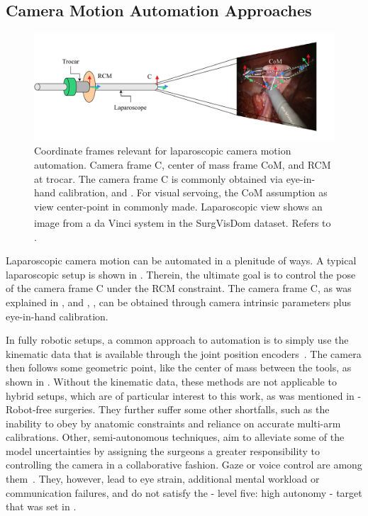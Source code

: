 \subsection{Camera Motion Automation Approaches}
\label{in:sec:automation_approaches}
\begin{figure}[htb]
    \centering
    \includegraphics[width=\textwidth]{introduction/fig/rule_based_approaches.pdf}
    \caption{Coordinate frames relevant for laparoscopic camera motion automation. Camera frame C, center of mass frame CoM, and RCM at trocar. The camera frame C is commonly obtained via eye-in-hand calibration,  and . For visual servoing, the CoM assumption as view center-point in commonly made. Laparoscopic view shows an image from a da Vinci\textsuperscript{\textregistered} system in the SurgVisDom\cite{zia2021surgical} dataset. Refers to .}
    \label{in:fig:com}
\end{figure}
Laparoscopic camera motion can be automated in a plenitude of ways. A typical laparoscopic setup is shown in . Therein, the ultimate goal is to control the pose of the camera frame C under the RCM constraint. The camera frame C, as was explained in 
, and , , can be obtained through camera intrinsic parameters plus eye-in-hand calibration.

In fully robotic setups, a common approach to automation is to simply use the kinematic data that is available through the joint position encoders~\cite{da2020scan}. The camera then follows some geometric point, like the center of mass between the tools, as shown in . Without the kinematic data, these methods are not applicable to hybrid setups, which are of particular interest to this work, as was mentioned in  - Robot-free surgeries. They further suffer some other shortfalls, such as the inability to obey by anatomic constraints and reliance on accurate multi-arm calibrations. Other, semi-autonomous techniques, aim to alleviate some of the model uncertainties by assigning the surgeons a greater responsibility to controlling the camera in a collaborative fashion. Gaze or voice control are among them~\cite{taniguchi2010classification}. They, however, lead to eye strain, additional mental workload or communication failures, and do not satisfy the - level five: high autonomy - target that was set in .

